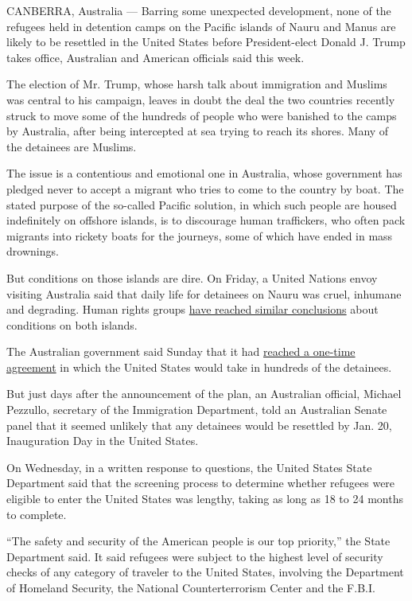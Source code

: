 CANBERRA, Australia --- Barring some unexpected development, none of the
refugees held in detention camps on the Pacific islands of Nauru and
Manus are likely to be resettled in the United States before
President-elect Donald J. Trump takes office, Australian and American
officials said this week.

The election of Mr. Trump, whose harsh talk about immigration and
Muslims was central to his campaign, leaves in doubt the deal the two
countries recently struck to move some of the hundreds of people who
were banished to the camps by Australia, after being intercepted at sea
trying to reach its shores. Many of the detainees are Muslims.

The issue is a contentious and emotional one in Australia, whose
government has pledged never to accept a migrant who tries to come to
the country by boat. The stated purpose of the so-called Pacific
solution, in which such people are housed indefinitely on offshore
islands, is to discourage human traffickers, who often pack migrants
into rickety boats for the journeys, some of which have ended in mass
drownings.

But conditions on those islands are dire. On Friday, a United Nations
envoy visiting Australia said that daily life for detainees on Nauru was
cruel, inhumane and degrading. Human rights groups
\href{http://www.nytimes.com/2016/08/04/world/australia/nauru-refugees-abuse-conditions.html}{have
reached similar conclusions} about conditions on both islands.

The Australian government said Sunday that it had
\href{http://www.nytimes.com/2016/11/13/world/australia/australia-refugees-united-states.html}{reached
a one-time agreement} in which the United States would take in hundreds
of the detainees.

But just days after the announcement of the plan, an Australian
official, Michael Pezzullo, secretary of the Immigration Department,
told an Australian Senate panel that it seemed unlikely that any
detainees would be resettled by Jan. 20, Inauguration Day in the United
States.

On Wednesday, in a written response to questions, the United States
State Department said that the screening process to determine whether
refugees were eligible to enter the United States was lengthy, taking as
long as 18 to 24 months to complete.

``The safety and security of the American people is our top priority,''
the State Department said. It said refugees were subject to the highest
level of security checks of any category of traveler to the United
States, involving the Department of Homeland Security, the National
Counterterrorism Center and the F.B.I.

